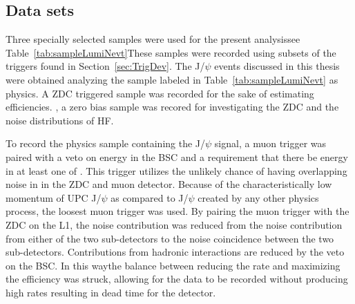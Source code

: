    \subsection{Data sets}
      Three specially selected samples were used for the present analysis\DIFdelbegin \DIFdel{(}\DIFdelend \DIFaddbegin {}\DIFaddend see Table~\ref{tab:sampleLumiNevt}\DIFdelbegin {}\DIFdelend \DIFaddbegin {}\DIFaddend These samples were recorded using subsets of the \DIFaddbegin {}\DIFaddend triggers found in 
        \DIFaddbegin {}\DIFaddend Section~\ref{sec:TrigDev}.
      The J/$\psi$ events discussed in this thesis were obtained analyzing the 
        sample labeled in Table~\ref{tab:sampleLumiNevt} as physics.
      A ZDC triggered \DIFaddbegin {}\DIFaddend sample was recorded for the sake of estimating
        efficiencies.
      \DIFdelbegin {}\DIFdelend \DIFaddbegin {}\DIFaddend , a zero bias sample was recored for investigating the ZDC and the 
        noise distributions of HF.
  \DIFdelbegin {}\DIFdelend 

      To record the physics sample containing the J/$\psi$ signal, a muon trigger
        was paired with a veto on energy in the BSC and a requirement that there 
        be energy in at least one of \DIFdelbegin {}\DIFdelend \DIFaddbegin {}\DIFaddend . 
      This trigger utilizes the unlikely chance of having overlapping noise in
        in the ZDC and muon detector.
      Because of the characteristically low momentum of UPC J/$\psi$ as compared
        to J/$\psi$ created by any other physics process, the loosest muon 
        trigger was used.
      By pairing the muon trigger with the ZDC on the L1, the noise contribution
        was reduced from the noise contribution from either of the two 
        sub-detectors to the noise coincidence between the two sub-detectors. 
      Contributions from hadronic interactions are reduced by the veto on the 
        BSC.
      In this way\DIFaddbegin \DIFadd{, }\DIFaddend the balance between reducing the rate and maximizing the 
        efficiency was struck, allowing for the data to be recorded without 
        producing high rates resulting in dead time for the detector.  

